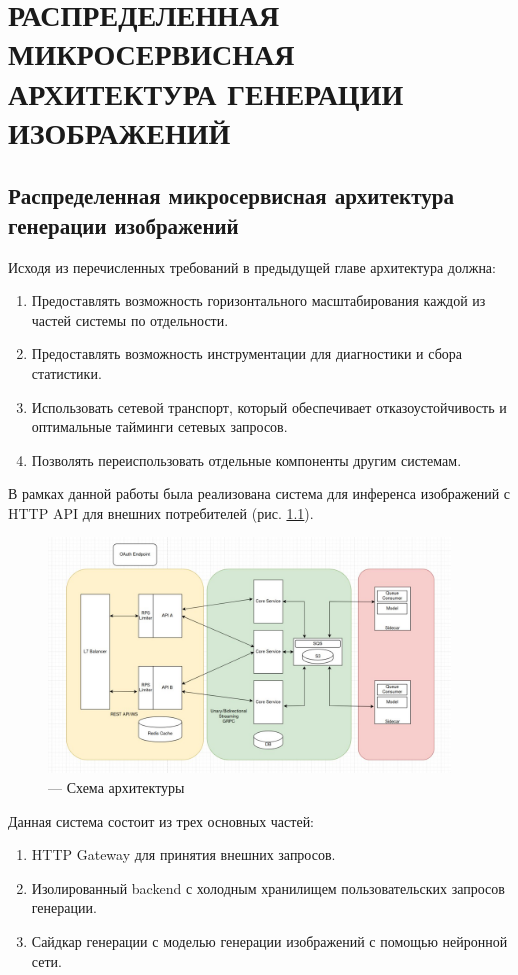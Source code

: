 \chapter{РАСПРЕДЕЛЕННАЯ МИКРОСЕРВИСНАЯ АРХИТЕКТУРА ГЕНЕРАЦИИ ИЗОБРАЖЕНИЙ}
\section{Распределенная микросервисная архитектура генерации изображений}
Исходя из перечисленных требований в предыдущей главе архитектура должна:
\begin{enumerate}
    \item Предоставлять возможность горизонтального масштабирования каждой из частей системы по отдельности.
    \item Предоставлять возможность инструментации для диагностики и сбора статистики.
    \item Использовать сетевой транспорт, который обеспечивает отказоустойчивость и оптимальные тайминги сетевых запросов.
    \item Позволять переиспользовать отдельные компоненты другим системам.
\end{enumerate}

В рамках данной работы была реализована система для инференса изображений с HTTP API для внешних потребителей (рис. \ref{fig:design}).

\begin{footnotesize}
\begin{figure}[H]
  \centering
  \includegraphics[width=0.95\textwidth]{img/design.png}
  \caption{--- Схема архитектуры}
    \label{fig:design}
\end{figure}
\end{footnotesize}

Данная система состоит из трех основных частей:
\begin{enumerate}
    \item HTTP Gateway для принятия внешних запросов.
    \item Изолированный backend с холодным хранилищем пользовательских запросов генерации.
    \item Сайдкар генерации с моделью генерации изображений с помощью нейронной сети.
\end{enumerate}

